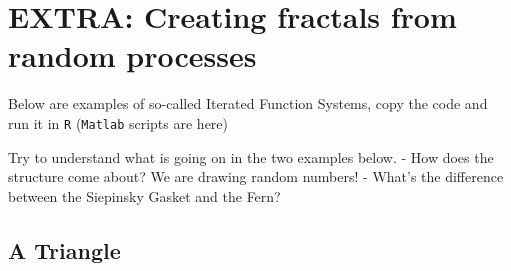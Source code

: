 \documentclass[]{book}
\let\stdsection\section
\renewcommand\section{\newpage\stdsection}
\begin{document}
\section{EXTRA: Creating fractals from random
processes}\label{extra-creating-fractals-from-random-processes}

Below are examples of so-called Iterated Function Systems, copy the code
and run it in \texttt{R} (\texttt{Matlab} scripts are here)

Try to understand what is going on in the two examples below. - How does
the structure come about? We are drawing random numbers! - What's the
difference between the Siepinsky Gasket and the Fern?

\subsection{A Triangle}\label{a-triangle}
\end{document}
